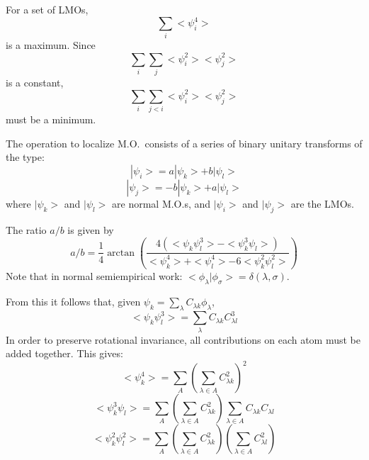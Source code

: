   For a set of LMOs, $$ \sum_i<\psi_i^4> $$
is a maximum.  Since $$ \sum_i\sum_j<\psi_i^2><\psi_j^2> $$ is a constant,
$$ \sum_i\sum_{j<i}<\psi_i^2><\psi_j^2> $$ must be a minimum.


The operation to localize M.O.\ consists of a series of binary unitary 
transforms of the type:
$$
|\psi_i> =a|\psi_k> +b|\psi_l> $$$$ 
|\psi_j> =-b|\psi_k> +a|\psi_l>  
$$
where $|\psi_k>$ and $|\psi_l>$ are normal M.O.s, and $|\psi_i>$ and $|\psi_j>$ 
are the LMOs.

The ratio $a/b$ is given by
$$
a/b = \frac{1}{4}\arctan\left(\frac{4(<\psi_k\psi_l^3>-<\psi_k^3\psi_l>)}
{<\psi_k^4>+<\psi_l^4>-6<\psi_k^2\psi_l^2>}\right)
$$
Note that in normal semiempirical work: $ <\phi_{\lambda}|\phi_{\sigma}>
=\delta(\lambda,\sigma)$.

From this it follows that, given 
$\psi_k = \sum_{\lambda}C_{\lambda k}\phi_{\lambda}$,
$$
<\psi_k\psi_l^3> = \sum_{\lambda}C_{\lambda k}C_{\lambda l}^3
$$
In order to preserve rotational invariance, all contributions on each atom must be
added together.  This gives:
$$
<\psi_k^4> = \sum_A(\sum_{\lambda\in A}C_{\lambda k}^2)^2 $$$$
<\psi_k^3\psi_l> = \sum_A(\sum_{\lambda\in A}C_{\lambda k}^2)
\sum_{\lambda\in A}C_{\lambda k}C_{\lambda l}$$$$
<\psi_k^2\psi_l^2> = \sum_A(\sum_{\lambda\in A}C_{\lambda k}^2)(\sum_{\lambda\in A}C_{\lambda l}^2)
$$

%
%
%
